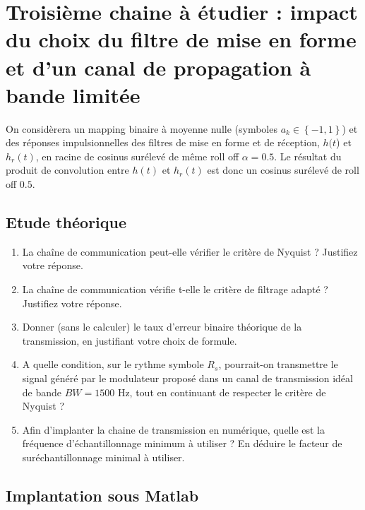 \documentclass{article}
\begin{document}
\section{Troisième chaine à étudier : impact du choix du filtre de mise en forme et d'un canal de propagation à bande limitée}
On considèrera un mapping binaire à moyenne nulle (symboles $a_k \in \left\{-1,1\right\}$) et des réponses impulsionnelles des filtres de mise en forme et de réception, $h(t$) et $h_r(t)$, en racine de cosinus surélevé de même roll off $\alpha=0.5$. Le résultat du produit de convolution entre $h(t)$ et $h_r(t)$ est donc un cosinus surélevé de roll off $0.5$.

\subsection{Etude théorique}

    \begin{enumerate}
        \item La chaîne de communication peut-elle vérifier le critère de Nyquist ? Justifiez votre réponse.
        \item La chaîne de communication vérifie t-elle le critère de filtrage adapté ? Justifiez votre réponse.
        \item Donner (sans le calculer) le taux d'erreur binaire théorique de la transmission, en justifiant votre choix de formule.
        \item A quelle condition, sur le rythme symbole $R_s$, pourrait-on transmettre le signal généré par le modulateur proposé dans un canal de transmission idéal de bande $BW=1500$ Hz, tout en continuant de respecter le critère de Nyquist ?
        \item Afin d'implanter la chaine de transmission en numérique, quelle est la fréquence d'échantillonnage minimum à utiliser ? En déduire le facteur de suréchantillonnage minimal à utiliser.
    \end{enumerate}

\subsection{Implantation sous Matlab}
\end{document}
